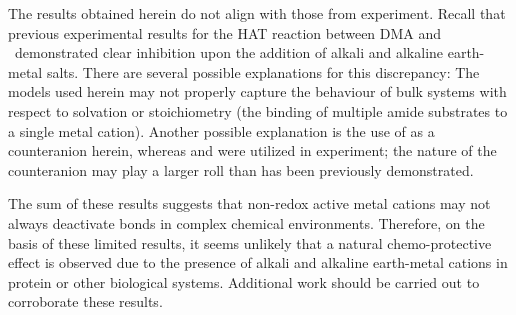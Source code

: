 \begin{doublespace}
The results obtained herein do not align with those from experiment. Recall that
previous experimental results for the HAT reaction between DMA and \cumo\
demonstrated clear inhibition upon the addition of alkali and alkaline
earth-metal salts. There are several possible explanations for this discrepancy:
The models used herein may not properly capture the behaviour of bulk systems
with respect to solvation or stoichiometry (the binding of multiple amide
substrates to a single metal cation). Another possible explanation is the use of
\ch{Cl^-} as a counteranion herein, whereas \ch{ClO4^-} and \ch{OTf^-} were
utilized in experiment; the nature of the counteranion may play a larger roll
than has been previously demonstrated.

The sum of these results suggests that non-redox active metal cations may not
always deactivate \ch{C-H} bonds in complex chemical environments. Therefore, on
the basis of these limited results, it seems unlikely that a natural
chemo-protective effect is observed due to the presence of alkali and alkaline
earth-metal cations in protein or other biological systems. Additional work
should be carried out to corroborate these results.


\end{doublespace}
